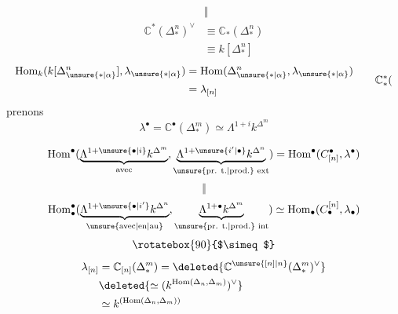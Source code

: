 

\[
\begin{aligned}
&\Vert\\
\mathbb C^*(\Delta_*^n)^\vee
&\equiv \mathbb C_*(\Delta_*^n)\\
&\equiv k[\Delta_*^n]
\end{aligned}
\]
\[
\begin{aligned}
\operatorname{Hom}_k(k[\Delta_{\unsure{*|\alpha}}^n],\lambda_{\unsure{*|\alpha}})&=\operatorname{Hom}(\Delta_{\unsure{*|\alpha}}^n,\lambda_{\unsure{*|\alpha}})\\
&=\lambda_{[n]}
\end{aligned}
\qquad \mathbb C_*^*(
\]
prenons
\[
\lambda^\bullet=\mathbb C^\bullet(\Delta_*^m)\simeq\Lambda^{1+i}k^{\Delta^m}
\]

\[
\operatorname{Hom}^\bullet(
\underbrace{\Lambda^{1+\unsure{\bullet|i}}k^{\Delta^m}}_{\text{avec}},
\underbrace{\Lambda^{1+\unsure{i'|\bullet}}k^{\Delta^n}}_{\text{\unsure{pr. t.|prod.} ext}})
=\operatorname{Hom}^\bullet(C_{[n]}^\bullet,\lambda^\bullet)
\]
\[
\Vert
\]
\[
\operatorname{Hom}_\bullet^\bullet(
\underbrace{\Lambda^{1+\unsure{\bullet|i'}}k^{\Delta^n}}_{\text{\unsure{avec|en|au}}},
\underbrace{\Lambda^{1+\bullet}k^{\Delta^m}}_{\text{\unsure{pr. t.|prod.} int}})
\simeq\operatorname{Hom}_\bullet(C_\bullet^{[n]},\lambda_\bullet)
\]
\[
\rotatebox{90}{$\simeq$}
\]
\[
\begin{aligned}
\lambda_{[n]}&=\mathbb C_{[n]}(\Delta_*^m)
=\deleted{\mathbb C^{\unsure{[n]|n}}(\Delta_*^m)^\vee}\\
&\deleted{\simeq(k^{\operatorname{Hom}(\Delta_n,\Delta_m)})^\vee}\\
&\simeq k^{(\operatorname{Hom}(\Delta_n,\Delta_m))}
\end{aligned}
\]

